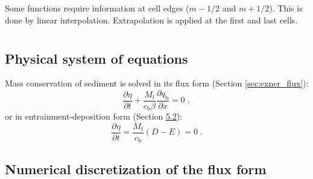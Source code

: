 \documentclass{deltares_report_elv}
\newcommand{\mathsub}[2]{#1_{\mathrm{#2}}}
\begin{document}
\section{\codeInterpolate{}}
\label{sec:codeInterpolate}

Some functions require information at cell edges ($m-1/2$ and $m+1/2$). This is done by linear interpolation. Extrapolation is applied at the first and last cells.

\section{\codeStruiksma{}}
\label{sec:codeStruiksma}

\section{\codeParticleActivity{}}
\label{sec:codeParticleActivity}

\section{\codeNodalPoint{}}
\label{sec:codeNodalPoint}

\section{\codeBedLevelUpdate{}}
\label{sec:codeBedLevelUpdate}

\subsection{Physical system of equations}

Mass conservation of sediment is solved in its flux form (Section \ref{sec:exner_flux}):
\begin{equation}
\label{eq:exner_flux}
\frac{\partial \eta}{\partial t}+\frac{\mathsub{M}{f}}{\mathsub{c}{b}\beta}\frac{\partial \mathsub{q}{b}}{\partial x}=0 \;,
\end{equation}
or in entrainment-deposition form (Section \ref{sec:exner_ed}):
\begin{equation}
\frac{\partial \eta}{\partial t}=\frac{\mathsub{M}{f}}{\mathsub{c}{b}}\left(D-E\right)=0 \;.
\end{equation}

\subsection{Numerical discretization of the flux form}
\label{sec:exner_ed}
\end{document}
